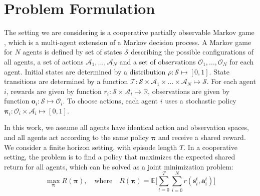 \documentclass[letterpaper]{article} %
\newcommand{\pol}[0]{\boldsymbol{\pi}}
\begin{document}







\section{Problem Formulation}
The setting we are considering is a cooperative partially observable Markov game \cite{littman94}, which is a multi-agent extension of a Markov decision process. A Markov game for $N$ agents is defined by set of states $\mathcal{S}$ describing the possible configurations of all agents, a set of actions $\mathcal{A}_1,...,\mathcal{A}_N$ and a set of observations $\mathcal{O}_1,...,\mathcal{O}_N$ for each agent. Initial states are determined by a distribution $\rho : \mathcal{S} \mapsto [0,1]$. State transitions are determined by a function $\mathcal{T} : \mathcal{S} \times \mathcal{A}_1 \times ... \times \mathcal{A}_N \mapsto \mathcal{S}$.
For each agent $i$, rewards are given by function
$r_i : \mathcal{S} \times \mathcal{A}_i \mapsto \mathbb{R}$, 
observations are given by function $\mathbf{o}_i : \mathcal{S} \mapsto \mathcal{O}_i$.
To choose actions, each agent $i$ uses a stochastic policy $\pol_i : \mathcal{O}_i \times \mathcal{A}_i \mapsto [0,1]$.

In this work, we assume all agents have identical action and observation spaces, and all agents act according to the same policy $\pol$ and receive a shared reward. We consider a finite horizon setting, with episode length $T$. In a cooperative setting, the problem is to find a policy that maximizes the expected shared return for all agents, which can be solved as a joint minimization problem:
\begin{equation*}
    \max_{\pol} R(\pol), \quad \text{where} \quad
    R(\pol) = \mathbb{E}\bigg[ \sum_{t=0}^T \sum_{i=0}^N r(\mathbf{s}^t_i, \mathbf{a}^t_i) \bigg]
\end{equation*}
\end{document}
